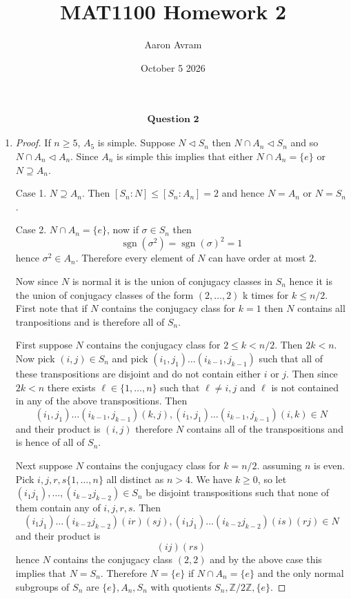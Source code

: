 \documentclass[12pt]{article}
\title{MAT1100 Homework 2}
\author{Aaron Avram}
\date{October 5 2026}
\begin{document}
\newtheorem{definition}{Definition}
\newtheorem{theorem}{Theorem}
\newtheorem{claim}{Claim}
\newtheorem{corollary}{Corollary}

\maketitle

\begin{align*}
    \textbf{Question 2}
\end{align*}

\begin{enumerate}
    \item[(a)]
    \begin{proof}
        If $n \geq 5$, $A_5$ is simple.
        Suppose $N \lhd S_n$ then $N \cap A_n \lhd S_n$ and so $N \cap A_n \lhd A_n$.
        Since $A_n$ is simple this implies that either $N \cap A_n = \{ e \}$ or $N \supseteq A_n$.

        Case 1. $N \supseteq A_n$. Then $[S_n : N] \leq [S_n: A_n] = 2$ and hence $N = A_n$ or $N = S_n$.

        Case 2. $N \cap A_n = \{ e \}$, now if $\sigma \in S_n$ then
        \[ \operatorname{sgn}(\sigma^2) = \operatorname{sgn}(\sigma)^2 = 1 \]
        hence $\sigma^2 \in A_n$. Therefore every element of $N$ can have order at most $2$.

        Now since $N$ is normal it is the union of conjugacy classes in $S_n$
        hence it is the union of conjugacy classes of the form $(2, \ldots, 2)$ k times
        for $k \leq n/2$. First note that if $N$ contains the conjugacy class for $k = 1$
        then $N$ contains all tranpositions and is therefore all of $S_n$.

        First suppose $N$ contains the conjugacy class for $2 \leq k < n/2$.
        Then $2k < n$. Now pick $(i, j) \in S_n$ and pick $(i_1, j_1) \ldots (i_{k-1}, j_{k-1})$
        such that all of these transpositions are disjoint and do not contain either $i$ or $j$.
        Then since $2k < n$ there exists $\ell \in \{ 1, \ldots, n \}$ such that $\ell \neq i, j$
        and $\ell$ is not contained in any of the above transpositions. Then
        \[ (i_1, j_1) \ldots (i_{k-1}, j_{k-1})(k, j), (i_1, j_1) \ldots (i_{k-1}, j_{k-1})(i, k) \in N \]
        and their product is $(i, j)$ therefore $N$ contains all of the transpositions
        and is hence of all of $S_n$.

        Next suppose $N$ contains the conjugacy class for $k = n/2$. assuming $n$ is even.
        Pick $i, j, r, s \{ 1, \ldots, n \}$ all distinct as $n > 4$. We have $k \geq 0$,
        so let $(i_1 j_1), \ldots, (i_{k-2}j_{k-2}) \in S_n$ be disjoint transpositions such that
        none of them contain any of $i, j, r, s$. Then
        \[ (i_1 j_1)\ldots(i_{k-2}j_{k-2})(ir)(sj), (i_1 j_1)\ldots(i_{k-2}j_{k-2})(is)(rj) \in N \]
        and their product is
        \[ (ij)(rs) \]
        hence $N$ contains the conjugacy class $(2, 2)$ and by the above case this implies that $N = S_n$.
        Therefore $N = \{ e \}$ if $N \cap A_n = \{ e \}$ and the only normal subgroups of $S_n$
        are $\{ e \}, A_n, S_n$ with quotients $S_n, \mathbb Z/2\mathbb Z, \{ e \}$.
    \end{proof}


\end{enumerate}
\end{document}
